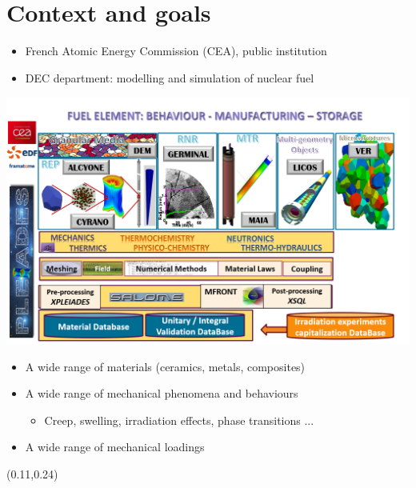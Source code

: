\documentclass{beamer}
\begin{document}
\PageTitre{}

\begin{frame}[fragile]
  \begin{flushleft}
    {\tiny
      \tableofcontents[hideallsubsections]
    }
  \end{flushleft}
\end{frame}

\section{Context and goals}

\begin{frame}[fragile]
  \begin{itemize}
    \item French Atomic Energy Commission (CEA), public institution
    \item DEC department: modelling and simulation of nuclear fuel
  \end{itemize}
  \begin{center}
    \includegraphics[trim = .2cm .2cm .2cm .6cm,clip,width=0.60\linewidth]{img/PLEIADES_2019_en.png}
    \vspace*{-3mm}
  \end{center}
  \begin{itemize}
    \item A wide range of materials (ceramics, metals, composites)
    \item A wide range of mechanical phenomena and behaviours
    \begin{itemize}
      \item Creep, swelling, irradiation effects, phase transitions ...
    \end{itemize}
    \item A wide range of mechanical loadings
  \end{itemize}
\begin{textblock}{.40}(0.11,0.24)
\end{textblock}


\end{frame}
\end{document}
